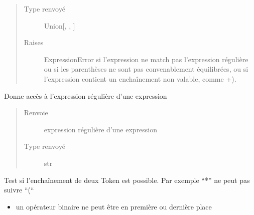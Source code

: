 \documentclass[letterpaper,10pt,french]{sphinxmanual}
\begin{document}
\begin{fulllineitems}
\begin{fulllineitems}
\begin{quote}
\begin{description}
\item[{Type renvoyé}] \leavevmode
Union{[}{\hyperref[\detokenize{arithmeticexpressionnodes:arithmeticexpressionnodes.ArithmeticExpressionNode}]{}}, {\hyperref[\detokenize{comparaisonexpressionnodes:comparaisonexpressionnodes.ComparaisonExpressionNode}]{}}, {\hyperref[\detokenize{logicexpressionnodes:logicexpressionnodes.LogicExpressionNode}]{}}{]}

\item[{Raises}] \leavevmode
ExpressionError si l’expression ne match pas l’expression régulière ou si les parenthèses ne sont pas convenablement équilibrées, ou si l’expression contient un enchaînement non valable, comme +).

\end{description}\end{quote}

\end{fulllineitems}


\begin{fulllineitems}
\label{\detokenize{expressionparser:expressionparser.ExpressionParser.expressionRegex}}
Donne accès à l’expression régulière d’une expression
\begin{quote}\begin{description}
\item[{Renvoie}] \leavevmode
expression régulière d’une expression

\item[{Type renvoyé}] \leavevmode
str

\end{description}\end{quote}

\end{fulllineitems}


\begin{fulllineitems}
\label{\detokenize{expressionparser:expressionparser.ExpressionParser.isLegal}}
Test si l’enchaînement de deux Token est possible. Par exemple “*” ne peut pas suivre “(“
\begin{itemize}
\item {} 
un opérateur binaire ne peut être en première ou dernière place


\end{itemize}
\end{fulllineitems}
\end{fulllineitems}
\end{document}
